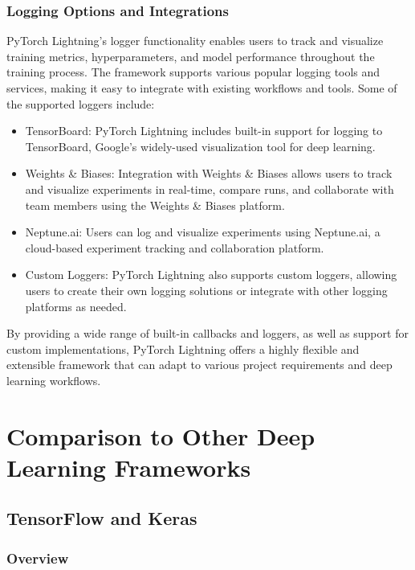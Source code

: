 \documentclass[12pt]{article}
\begin{document}
\subsubsection{Logging Options and Integrations}

PyTorch Lightning's logger functionality enables users to track and visualize training metrics, hyperparameters, and model performance throughout the training process. The framework supports various popular logging tools and services, making it easy to integrate with existing workflows and tools. Some of the supported loggers include:

\begin{itemize}
    \item TensorBoard: PyTorch Lightning includes built-in support for logging to TensorBoard, Google's widely-used visualization tool for deep learning.
    \item Weights \& Biases: Integration with Weights \& Biases allows users to track and visualize experiments in real-time, compare runs, and collaborate with team members using the Weights \& Biases platform.
    \item Neptune.ai: Users can log and visualize experiments using Neptune.ai, a cloud-based experiment tracking and collaboration platform.
    \item Custom Loggers: PyTorch Lightning also supports custom loggers, allowing users to create their own logging solutions or integrate with other logging platforms as needed.
\end{itemize}

By providing a wide range of built-in callbacks and loggers, as well as support for custom implementations, PyTorch Lightning offers a highly flexible and extensible framework that can adapt to various project requirements and deep learning workflows.

\section{Comparison to Other Deep Learning Frameworks}

\subsection{TensorFlow and Keras}

\subsubsection{Overview}
\end{document}
